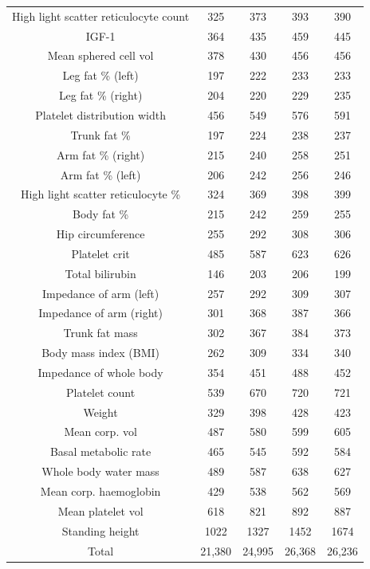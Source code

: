 \begin{footnotesize}
\begin{longtable}[h!]{|c|c|c|c|c|}
High light scatter reticulocyte count & 325 & 373 & 393 & 390 \\
IGF-1 & 364 & 435 & 459 & 445 \\
Mean sphered cell vol & 378 & 430 & 456 & 456 \\
Leg fat \% (left) & 197 & 222 & 233 & 233 \\
Leg fat \% (right) & 204 & 220 & 229 & 235 \\
Platelet distribution width & 456 & 549 & 576 & 591 \\
Trunk fat \% & 197 & 224 & 238 & 237 \\
Arm fat \% (right) & 215 & 240 & 258 & 251 \\
Arm fat \% (left) & 206 & 242 & 256 & 246 \\
High light scatter reticulocyte \% & 324 & 369 & 398 & 399 \\
Body fat \% & 215 & 242 & 259 & 255 \\
Hip circumference & 255 & 292 & 308 & 306 \\
Platelet crit & 485 & 587 & 623 & 626 \\
Total bilirubin & 146 & 203 & 206 & 199 \\
Impedance of arm (left) & 257 & 292 & 309 & 307 \\
Impedance of arm (right) & 301 & 368 & 387 & 366 \\
Trunk fat mass & 302 & 367 & 384 & 373 \\
Body mass index (BMI) & 262 & 309 & 334 & 340 \\
Impedance of whole body & 354 & 451 & 488 & 452 \\
Platelet count & 539 & 670 & 720 & 721 \\
Weight & 329 & 398 & 428 & 423 \\
Mean corp. vol & 487 & 580 & 599 & 605 \\
Basal metabolic rate & 465 & 545 & 592 & 584 \\
Whole body water mass & 489 & 587 & 638 & 627 \\
Mean corp. haemoglobin & 429 & 538 & 562 & 569 \\
Mean platelet vol & 618 & 821 & 892 & 887 \\
Standing height & 1022 & 1327 & 1452 & 1674 \\
\hline
Total & 21,380 & 24,995 & 26,368 & 26,236
\label{tab:loci_qt}
\end{longtable}
\end{footnotesize}

